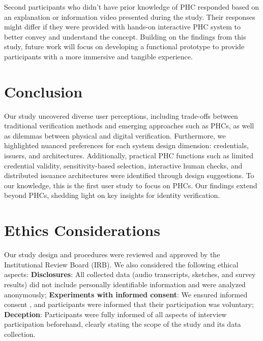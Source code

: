Second participants who didn't have prior knowledge of PHC responded based on an explanation or information video presented during the study. Their responses might differ if they were provided with hands-on interactive PHC system to better convey and understand the concept.
Building on the findings from this study, future work will focus on developing a functional prototype to provide participants with a more immersive and tangible experience.

\vspace{-2mm}
\section{Conclusion}
\vspace{-2mm}
Our study uncovered diverse user perceptions, including trade-offs between traditional verification methods and emerging approaches such as PHCs, as well as dilemmas between physical and digital verification. Furthermore, we highlighted nuanced preferences for each system design dimension: credentials, issuers, and architectures. Additionally, practical PHC functions such as limited credential validity, sensitivity-based selection, interactive human checks, and distributed issuance architectures were identified through design suggestions.
To our knowledge, this is the first user study to focus on PHCs. Our findings extend beyond PHCs, shedding light on key insights for identity verification.

\section{Ethics Considerations}
Our study design and procedures were reviewed and approved by the Institutional Review Board (IRB). We also considered the following ethical aspects:
\textbf{Disclosures}: All collected data (audio transcripts, sketches, and survey results) did not include personally identifiable information and were analyzed anonymously;
\textbf{Experiments with informed consent}: We ensured informed consent , and participants were informed that their participation was voluntary;
\textbf{Deception}: Participants were fully informed of all aspects of interview participation beforehand, clearly stating the scope of the study and its data collection.

